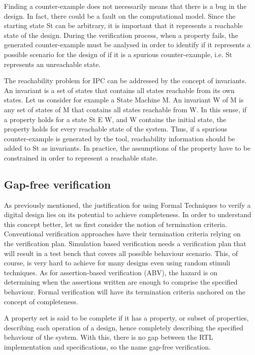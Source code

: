 Finding a counter-example does not necessarily means that there is a bug in the design. In fact, there could be a fault on the computational model. Since the starting state St can be arbitrary, it is important that it represents a reachable state of the design. During the verification process, when a property fails, the generated counter-example must be analysed in order to identify if it represents a possible scenario for the design of if it is a spurious counter-example, i.e. St represents an unreachable state.

The reachability problem for IPC can be addressed by the concept of invariants. An invariant is a set of states that contains all states reachable from its own states. Let us consider for example a State Machine M. An invariant W of M is any set of states of M that contains all states reachable from W. In this sense, if a property holds for a state St E W, and W contains the initial state, the property holds for every reachable state of the system. Thus, if a spurious counter-example is generated by the tool, reachability information should be added to St as invariants. In practice, the assumptions of the property have to be constrained in order to represent a reachable state. 

\subsection{Gap-free verification}

As previously mentioned, the justification for using Formal Techniques to verify a digital design lies on its potential to achieve completeness. In order to understand this concept better, let us first consider the notion of termination criteria. Conventional verification approaches have their termination criteria relying on the verification plan. Simulation based verification needs a verification plan that will result in a test bench that covers all possible behaviour scenario. This, of course, is very hard to achieve for many designs even using random stimuli techniques. As for assertion-based verification (ABV), the hazard is on determining when the assertions written are enough to comprise the specified behaviour. Formal verification will have its termination criteria anchored on the concept of completeness.

A property set is said to be complete if it has a property, or subset of properties, describing each operation of a design, hence completely describing the specified behaviour of the system. With this, there is no gap between the RTL implementation and specifications, so the name gap-free verification.  

